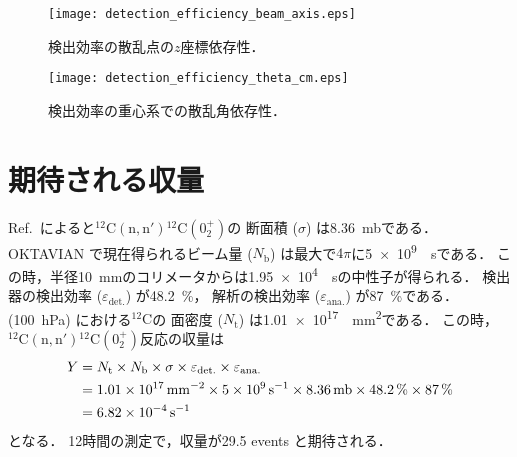 \documentclass[../master]{subfiles}
\begin{document}
\begin{figure}
  \centering
  \texttt{[image: detection\_efficiency\_beam\_axis.eps]}
  \caption{検出効率の散乱点の$z$座標依存性．}
  \label{fig::detection_efficiency_beam_axis}
  \texttt{[image: detection\_efficiency\_theta\_cm.eps]}
  \caption{検出効率の重心系での散乱角依存性．}
  \label{fig::detection_efficiency_theta_cm}
\end{figure}

\section{期待される収量}
Ref.~\cite{takahashietal,kondoetal}によると${}^{12}\mathrm{C}(\mathrm{n},\mathrm{n}'){}^{12}\mathrm{C}(0_{2}^{+})$の
断面積 ($\sigma$) は\SI{8.36}{\milli\barn}である．
OKTAVIAN で現在得られるビーム量 ($N_{\text{b}}$) は最大で$4\pi$に\SI{5e9}{\per\second}である．
この時，半径\SI{10}{\milli\metre}のコリメータからは\SI{1.95e4}{\per\second}の中性子が得られる．
検出器の検出効率 ($\varepsilon_{\text{det.}}$) が\SI{48.2}{\percent}，
解析の検出効率 ($\varepsilon_{\text{ana.}}$) が\SI{87}{\percent}である．
\isoButaneHydro (\SI{100}{\hecto\pascal}) における${}^{12}\mathrm{C}$の
面密度 ($N_{\text{t}}$) は\SI{1.01e17}{\per\square\milli\metre}である．
この時，${}^{12}\mathrm{C}(\mathrm{n},\mathrm{n}'){}^{12}\mathrm{C}(0_{2}^{+})$反応の収量は
\begin{align}
  Y &= N_{\text{t}}\times N_{\text{b}}\times \sigma \times\varepsilon_{\text{det.}}\times\varepsilon_{\text{ana.}} \notag\\
  &= \SI{1.01e17}{\per\square\milli\metre}\times\SI{5e9}{\per\second}\times\SI{8.36}{\milli\barn}
  \times\SI{48.2}{\percent}\times\SI{87}{\percent} \notag\\
  &= \SI{6.82e-4}{\per\second}
\end{align}
となる．
12時間の測定で，収量が\num{29.5} events と期待される．
\end{document}
